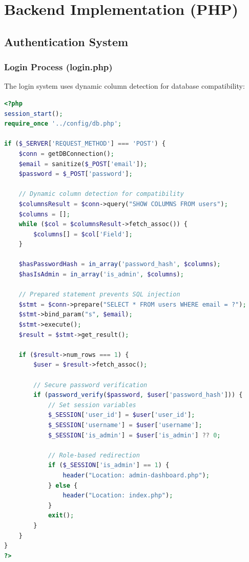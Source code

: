 \documentclass[12pt,a4paper]{article}
\begin{document}
\section{Backend Implementation (PHP)}

\subsection{Authentication System}

\subsubsection{Login Process (login.php)}

The login system uses dynamic column detection for database compatibility:

\begin{lstlisting}[language=PHP, caption=Authentication Logic]
<?php
session_start();
require_once '../config/db.php';

if ($_SERVER['REQUEST_METHOD'] === 'POST') {
    $conn = getDBConnection();
    $email = sanitize($_POST['email']);
    $password = $_POST['password'];
    
    // Dynamic column detection for compatibility
    $columnsResult = $conn->query("SHOW COLUMNS FROM users");
    $columns = [];
    while ($col = $columnsResult->fetch_assoc()) {
        $columns[] = $col['Field'];
    }
    
    $hasPasswordHash = in_array('password_hash', $columns);
    $hasIsAdmin = in_array('is_admin', $columns);
    
    // Prepared statement prevents SQL injection
    $stmt = $conn->prepare("SELECT * FROM users WHERE email = ?");
    $stmt->bind_param("s", $email);
    $stmt->execute();
    $result = $stmt->get_result();
    
    if ($result->num_rows === 1) {
        $user = $result->fetch_assoc();
        
        // Secure password verification
        if (password_verify($password, $user['password_hash'])) {
            // Set session variables
            $_SESSION['user_id'] = $user['user_id'];
            $_SESSION['username'] = $user['username'];
            $_SESSION['is_admin'] = $user['is_admin'] ?? 0;
            
            // Role-based redirection
            if ($_SESSION['is_admin'] == 1) {
                header("Location: admin-dashboard.php");
            } else {
                header("Location: index.php");
            }
            exit();
        }
    }
}
?>
\end{lstlisting}
\end{document}
